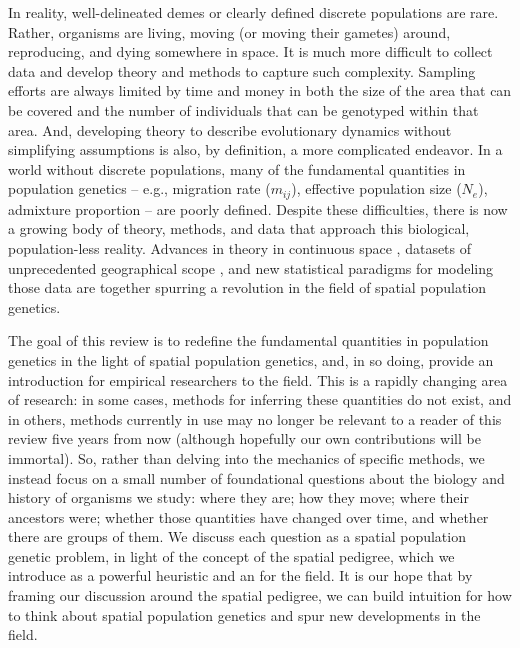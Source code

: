 \documentclass{ar-1col}
\newcommand{\g}[1]{{\color{blue}{#1}}}
\begin{document}
In reality, well-delineated demes or clearly defined discrete populations are rare.
Rather, organisms are living,
moving (or moving their gametes) around,
reproducing, and dying somewhere in space.
It is much more difficult to collect data and develop theory and methods
to capture such complexity.
Sampling efforts are always limited by time and money
in both the size of the area that can be covered
and the number of individuals that can be genotyped within that area.
And, developing theory to describe evolutionary dynamics
without simplifying assumptions is also,
by definition,
a more complicated endeavor.
In a world without discrete populations, 
many of the fundamental quantities in population genetics -- 
e.g., migration rate ($m_{ij}$), 
effective population size ($N_e$),
admixture proportion
--
are poorly defined.
Despite these difficulties,
there is now a growing body of theory, methods, and data
that approach this biological, population-less reality.
Advances in theory in continuous space 
\citep{barton-depaulis-etheridge, barton2010modelling, barton2010newmodel, Barton2013},
datasets of unprecedented geographical scope 
\citep[e.g.,][]{POBI, Aguillon2017deconstructing, Shaffer195743},
and new statistical paradigms for modeling those data 
\citep{petkova2016visualizing, ringbauer2017inferring, ringbauer2018estimating, conStruct}
are together spurring a revolution in the field of spatial population genetics.

The goal of this review
is to redefine the fundamental quantities in population genetics 
in the light of spatial population genetics, 
and, in so doing, provide an introduction for empirical researchers
to the field.
This is a rapidly changing area of research:
in some cases, methods for inferring these quantities do not exist, 
and in others, 
methods currently in use may no longer be relevant
to a reader of this review five years from now
(although hopefully our own contributions will be immortal).
So, rather than delving into the mechanics of specific methods,
we instead focus on a small number of foundational questions 
about the biology and history of organisms we study:
where they are; how they move; where their ancestors were;
whether those quantities have changed over time, 
and whether there are groups of them.
We discuss each question
as a spatial population genetic problem, 
in light of the concept of the spatial pedigree,
which we introduce as a powerful heuristic
and an \g{organizing principle} for the field.
It is our hope that by framing our discussion around the spatial pedigree, 
we can build intuition for how to think about spatial population genetics 
and spur new developments in the field.
\end{document}
